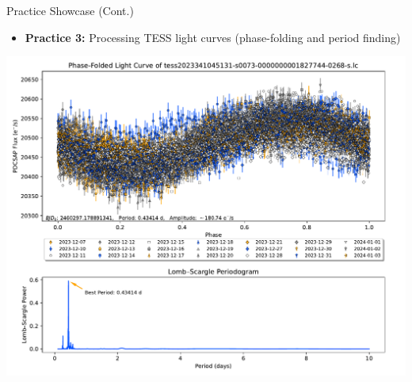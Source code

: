 \documentclass[12pt, aspectratio=169]{beamer}
\begin{document}
  \begin{frame}[t]{Practice Showcase (Cont.)}
    \begin{itemize}
      \item \textbf{Practice 3:} Processing TESS light curves (phase-folding and
      period finding)
    \end{itemize}
    \centering
    \includegraphics[width=\textheight]{figures/3-2.pdf}
  \end{frame}
\end{document}
